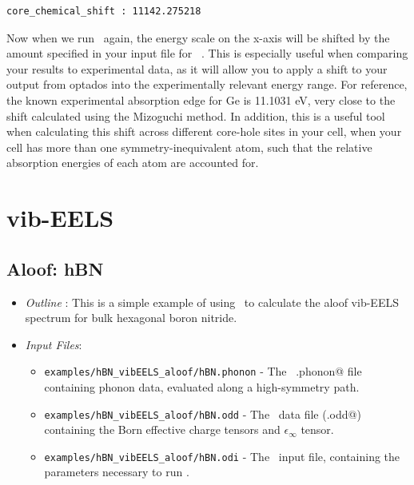 \documentclass[a4paper,11pt,twoside]{book}
\begin{document}
{\begin{enumerate}
\begin{verbatim}
core_chemical_shift : 11142.275218
\end{verbatim}
Now when we run \optados\ again, the energy scale on the x-axis will be shifted by the amount specified in your input file for \optados\ . This is especially useful when comparing your results to experimental data, as it will allow you to apply a shift to your output from optados into the experimentally relevant energy range. For reference, the known experimental absorption edge for Ge is 11.1031 eV, very close to the shift calculated using the Mizoguchi method. In addition, this is a useful tool when calculating this shift across different core-hole sites in your cell, when your cell has more than one symmetry-inequivalent atom, such that the relative absorption energies of each atom are accounted for.
\end{enumerate}

\section{vib-EELS}


\subsection{Aloof: hBN}

\begin{itemize}
\item \emph{Outline} : This is a simple example of using \optados\ to calculate the aloof vib-EELS spectrum for bulk hexagonal boron nitride.
\item \emph{Input Files}:
\begin{itemize}
\item \verb#examples/hBN_vibEELS_aloof/hBN.phonon# - The \castep\ \verb@.phonon@ file containing phonon data, evaluated along a high-symmetry path.
\item \verb#examples/hBN_vibEELS_aloof/hBN.odd# - The \optados\ data file (\verb@.odd@) containing the Born effective charge tensors and $\epsilon_{\infty}$ tensor.
\item \verb#examples/hBN_vibEELS_aloof/hBN.odi# - The \optados\ input file, containing the parameters necessary to run \optados.
\end{itemize}
\end{itemize}

}
\end{document}
